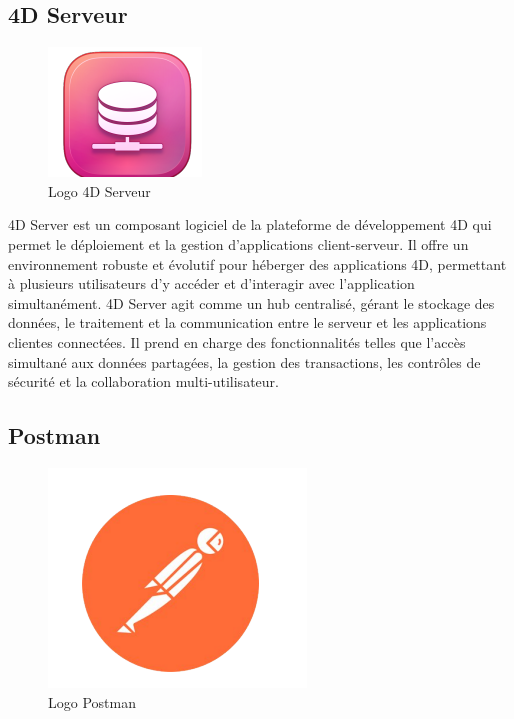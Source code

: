 \subsection{4D Serveur}


\begin{figure}[H]
    \centering
    \includegraphics[scale=1.5]{Logos/4dServeyr.PNG}
    \caption{Logo 4D Serveur}
\end{figure}

4D Server est un composant logiciel de la plateforme de
développement 4D qui permet le déploiement et la gestion d’applications client-serveur. Il offre un environnement robuste et évolutif pour héberger des applications 4D, permettant à plusieurs utilisateurs d’y accéder et d’interagir avec
l’application simultanément. 4D Server agit comme un hub centralisé, gérant le stockage
des données, le traitement et la communication entre le serveur et les applications clientes
connectées. Il prend en charge des fonctionnalités telles que l’accès simultané aux données partagées, la gestion des transactions, les contrôles de sécurité et la collaboration
multi-utilisateur.

\subsection{Postman}

\begin{figure}[H]
    \centering
    \includegraphics[scale=0.5]{Logos/postman.png}
    \caption{Logo  Postman}
\end{figure}

